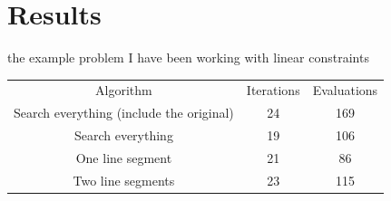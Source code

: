 \documentclass{article}
\begin{document}
\section{Results}

the example problem I have been working with
    linear constraints
%





\begin{center}
\begin{tabular}{ c c c }
 Algorithm & Iterations & Evaluations \\ 
 Search everything (include the original) & 24 & 169 \\  
 Search everything & 19 & 106    \\
 One line segment & 21 & 86 \\
 Two line segments & 23 & 115 \\
\end{tabular}
\end{center}
\end{document}
